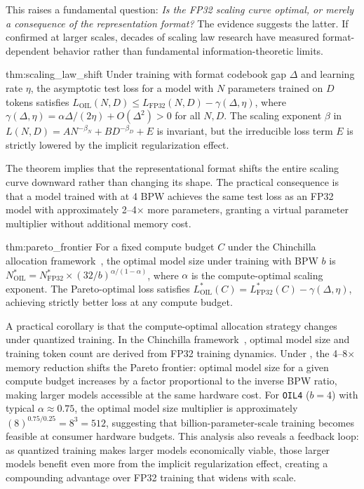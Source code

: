 This raises a fundamental question: \textit{Is the FP32 scaling curve optimal, or merely a consequence of the representation format?} The \OIL{} evidence suggests the latter. If confirmed at larger scales, decades of scaling law research have measured format-dependent behavior rather than fundamental information-theoretic limits.

\begin{mythm}{thm:scaling_law_shift}
Under \OIL{} training with format codebook gap $\Delta$ and learning rate $\eta$, the asymptotic test loss for a model with $N$ parameters trained on $D$ tokens satisfies $L_{\mathrm{OIL}}(N, D) \leq L_{\mathrm{FP32}}(N, D) - \gamma(\Delta, \eta)$, where $\gamma(\Delta, \eta) = \alpha\Delta/(2\eta) + O(\Delta^2) > 0$ for all $N, D$. The scaling exponent $\beta$ in $L(N, D) = AN^{-\beta_N} + BD^{-\beta_D} + E$ is invariant, but the irreducible loss term $E$ is strictly lowered by the implicit regularization effect.
\end{mythm}

The theorem implies that the representational format shifts the entire scaling curve downward rather than changing its shape. The practical consequence is that a model trained with \OIL{} at 4 BPW achieves the same test loss as an FP32 model with approximately 2--4$\times$ more parameters, granting a virtual parameter multiplier without additional memory cost.

\begin{mythm}{thm:pareto_frontier}
For a fixed compute budget $C$ under the Chinchilla allocation framework~\cite{hoffmann2022}, the optimal model size under \OIL{} training with BPW $b$ is $N_{\mathrm{OIL}}^* = N_{\mathrm{FP32}}^* \times (32/b)^{\alpha/(1-\alpha)}$, where $\alpha$ is the compute-optimal scaling exponent. The Pareto-optimal loss satisfies $L_{\mathrm{OIL}}^*(C) = L_{\mathrm{FP32}}^*(C) - \gamma(\Delta, \eta)$, achieving strictly better loss at any compute budget.
\end{mythm}

A practical corollary is that the compute-optimal allocation strategy changes under quantized training. In the Chinchilla framework~\cite{hoffmann2022}, optimal model size and training token count are derived from FP32 training dynamics. Under \OIL{}, the 4--8$\times$ memory reduction shifts the Pareto frontier: optimal model size for a given compute budget increases by a factor proportional to the inverse BPW ratio, making larger models accessible at the same hardware cost. For \texttt{OIL4} ($b = 4$) with typical $\alpha \approx 0.75$, the optimal model size multiplier is approximately $(8)^{0.75/0.25} = 8^3 = 512$\times, suggesting that billion-parameter-scale training becomes feasible at consumer hardware budgets. This analysis also reveals a feedback loop: as quantized training makes larger models economically viable, those larger models benefit even more from the implicit regularization effect, creating a compounding advantage over FP32 training that widens with scale.

